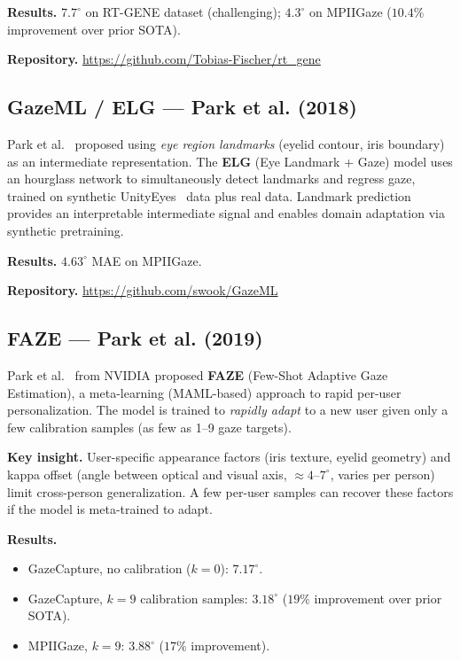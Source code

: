 \documentclass[11pt,a4paper]{article}
\begin{document}
\textbf{Results.} $7.7^\circ$ on RT-GENE dataset (challenging); $4.3^\circ$ on MPIIGaze ($10.4\%$ improvement over prior SOTA).

\textbf{Repository.} \url{https://github.com/Tobias-Fischer/rt_gene}

\subsection{GazeML / ELG --- Park et al. (2018)}

Park et al.~\cite{park2018learning} proposed using \textit{eye region landmarks} (eyelid contour, iris boundary) as an intermediate representation.
The \textbf{ELG} (Eye Landmark + Gaze) model uses an hourglass network to simultaneously detect landmarks and regress gaze, trained on synthetic UnityEyes~\cite{wood2016learning} data plus real data.
Landmark prediction provides an interpretable intermediate signal and enables domain adaptation via synthetic pretraining.

\textbf{Results.} $4.63^\circ$ MAE on MPIIGaze.

\textbf{Repository.} \url{https://github.com/swook/GazeML}

\subsection{FAZE --- Park et al. (2019)}

Park et al.~\cite{park2019faze} from NVIDIA proposed \textbf{FAZE} (Few-Shot Adaptive Gaze Estimation), a meta-learning (MAML-based) approach to rapid per-user personalization.
The model is trained to \textit{rapidly adapt} to a new user given only a few calibration samples (as few as 1--9 gaze targets).

\textbf{Key insight.} User-specific appearance factors (iris texture, eyelid geometry) and kappa offset (angle between optical and visual axis, ${\approx}4$--$7^\circ$, varies per person) limit cross-person generalization.
A few per-user samples can recover these factors if the model is meta-trained to adapt.

\textbf{Results.}
\begin{itemize}
  \item GazeCapture, no calibration ($k=0$): $7.17^\circ$.
  \item GazeCapture, $k=9$ calibration samples: $\mathbf{3.18^\circ}$ ($19\%$ improvement over prior SOTA).
  \item MPIIGaze, $k=9$: $3.88^\circ$ ($17\%$ improvement).
\end{itemize}
\end{document}
